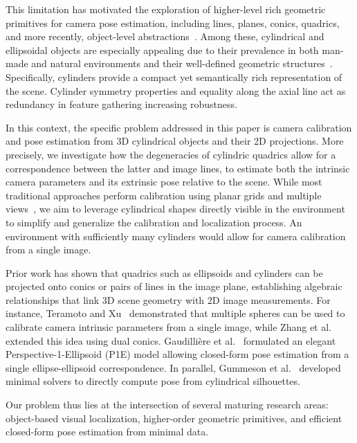 This limitation has motivated the exploration of higher-level rich geometric primitives for camera pose estimation, including lines, planes, conics, quadrics, and more recently, object-level abstractions~\cite{Xu2017,Crocco2016}. Among these, cylindrical and ellipsoidal objects are especially appealing due to their prevalence in both man-made and natural environments and their well-defined geometric structures~\cite{gummeson22pose,Gaudilliere2023}. Specifically, cylinders provide a compact yet semantically rich representation of the scene. Cylinder symmetry properties and equality along the axial line act as redundancy in feature gathering increasing robustness.

In this context, the specific problem addressed in this paper is camera calibration and pose estimation from 3D cylindrical objects and their 2D projections. More precisely, we investigate how the degeneracies of cylindric quadrics allow for a correspondence between the latter and image lines, to estimate both the intrinsic camera parameters and its extrinsic pose relative to the scene. While most traditional approaches perform calibration using planar grids and multiple views~\cite{Zhang2000,Maybank1992}, we aim to leverage cylindrical shapes directly visible in the environment to simplify and generalize the calibration and localization process. An environment with sufficiently many cylinders would allow for camera calibration from a single image.

Prior work has shown that quadrics such as ellipsoids and cylinders can be projected onto conics or pairs of lines in the image plane, establishing algebraic relationships that link 3D scene geometry with 2D image measurements. For instance, Teramoto and Xu~\cite{Teramoto2002} demonstrated that multiple spheres can be used to calibrate camera intrinsic parameters from a single image, while Zhang et al.~\cite{Zhang2007} extended this idea using dual conics. Gaudillière et al.~\cite{Gaudilliere2023} formulated an elegant Perspective-1-Ellipsoid (P1E) model allowing closed-form pose estimation from a single ellipse-ellipsoid correspondence. In parallel, Gummeson et al.~\cite{gummeson22pose} developed minimal solvers to directly compute pose from cylindrical silhouettes.

Our problem thus lies at the intersection of several maturing research areas: object-based visual localization, higher-order geometric primitives, and efficient closed-form pose estimation from minimal data.


